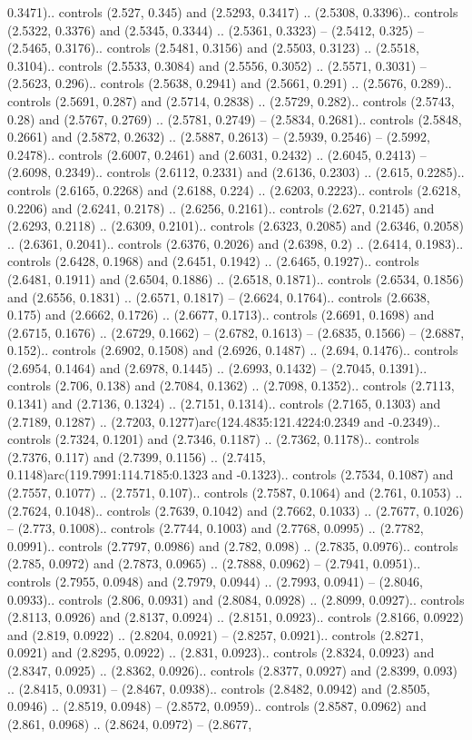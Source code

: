 0.3471).. controls (2.527, 0.345) and (2.5293, 0.3417) .. (2.5308, 0.3396).. controls (2.5322, 0.3376) and (2.5345, 0.3344) .. (2.5361, 0.3323) -- (2.5412, 0.325) -- (2.5465, 0.3176).. controls (2.5481, 0.3156) and (2.5503, 0.3123) .. (2.5518, 0.3104).. controls (2.5533, 0.3084) and (2.5556, 0.3052) .. (2.5571, 0.3031) -- (2.5623, 0.296).. controls (2.5638, 0.2941) and (2.5661, 0.291) .. (2.5676, 0.289).. controls (2.5691, 0.287) and (2.5714, 0.2838) .. (2.5729, 0.282).. controls (2.5743, 0.28) and (2.5767, 0.2769) .. (2.5781, 0.2749) -- (2.5834, 0.2681).. controls (2.5848, 0.2661) and (2.5872, 0.2632) .. (2.5887, 0.2613) -- (2.5939, 0.2546) -- (2.5992, 0.2478).. controls (2.6007, 0.2461) and (2.6031, 0.2432) .. (2.6045, 0.2413) -- (2.6098, 0.2349).. controls (2.6112, 0.2331) and (2.6136, 0.2303) .. (2.615, 0.2285).. controls (2.6165, 0.2268) and (2.6188, 0.224) .. (2.6203, 0.2223).. controls (2.6218, 0.2206) and (2.6241, 0.2178) .. (2.6256, 0.2161).. controls (2.627, 0.2145) and (2.6293, 0.2118) .. (2.6309, 0.2101).. controls (2.6323, 0.2085) and (2.6346, 0.2058) .. (2.6361, 0.2041).. controls (2.6376, 0.2026) and (2.6398, 0.2) .. (2.6414, 0.1983).. controls (2.6428, 0.1968) and (2.6451, 0.1942) .. (2.6465, 0.1927).. controls (2.6481, 0.1911) and (2.6504, 0.1886) .. (2.6518, 0.1871).. controls (2.6534, 0.1856) and (2.6556, 0.1831) .. (2.6571, 0.1817) -- (2.6624, 0.1764).. controls (2.6638, 0.175) and (2.6662, 0.1726) .. (2.6677, 0.1713).. controls (2.6691, 0.1698) and (2.6715, 0.1676) .. (2.6729, 0.1662) -- (2.6782, 0.1613) -- (2.6835, 0.1566) -- (2.6887, 0.152).. controls (2.6902, 0.1508) and (2.6926, 0.1487) .. (2.694, 0.1476).. controls (2.6954, 0.1464) and (2.6978, 0.1445) .. (2.6993, 0.1432) -- (2.7045, 0.1391).. controls (2.706, 0.138) and (2.7084, 0.1362) .. (2.7098, 0.1352).. controls (2.7113, 0.1341) and (2.7136, 0.1324) .. (2.7151, 0.1314).. controls (2.7165, 0.1303) and (2.7189, 0.1287) .. (2.7203, 0.1277)arc(124.4835:121.4224:0.2349 and -0.2349).. controls (2.7324, 0.1201) and (2.7346, 0.1187) .. (2.7362, 0.1178).. controls (2.7376, 0.117) and (2.7399, 0.1156) .. (2.7415, 0.1148)arc(119.7991:114.7185:0.1323 and -0.1323).. controls (2.7534, 0.1087) and (2.7557, 0.1077) .. (2.7571, 0.107).. controls (2.7587, 0.1064) and (2.761, 0.1053) .. (2.7624, 0.1048).. controls (2.7639, 0.1042) and (2.7662, 0.1033) .. (2.7677, 0.1026) -- (2.773, 0.1008).. controls (2.7744, 0.1003) and (2.7768, 0.0995) .. (2.7782, 0.0991).. controls (2.7797, 0.0986) and (2.782, 0.098) .. (2.7835, 0.0976).. controls (2.785, 0.0972) and (2.7873, 0.0965) .. (2.7888, 0.0962) -- (2.7941, 0.0951).. controls (2.7955, 0.0948) and (2.7979, 0.0944) .. (2.7993, 0.0941) -- (2.8046, 0.0933).. controls (2.806, 0.0931) and (2.8084, 0.0928) .. (2.8099, 0.0927).. controls (2.8113, 0.0926) and (2.8137, 0.0924) .. (2.8151, 0.0923).. controls (2.8166, 0.0922) and (2.819, 0.0922) .. (2.8204, 0.0921) -- (2.8257, 0.0921).. controls (2.8271, 0.0921) and (2.8295, 0.0922) .. (2.831, 0.0923).. controls (2.8324, 0.0923) and (2.8347, 0.0925) .. (2.8362, 0.0926).. controls (2.8377, 0.0927) and (2.8399, 0.093) .. (2.8415, 0.0931) -- (2.8467, 0.0938).. controls (2.8482, 0.0942) and (2.8505, 0.0946) .. (2.8519, 0.0948) -- (2.8572, 0.0959).. controls (2.8587, 0.0962) and (2.861, 0.0968) .. (2.8624, 0.0972) -- (2.8677, 